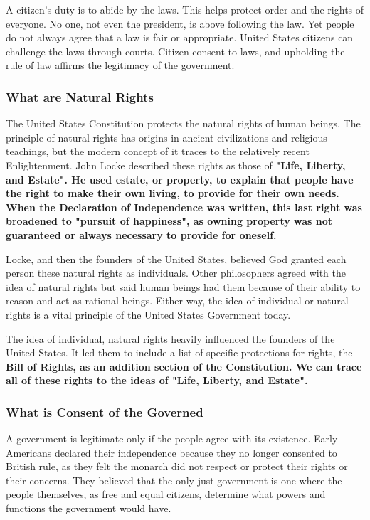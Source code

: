 A citizen's duty is to abide by the laws. This helps protect order and the
rights of everyone. No one, not even the president, is above following the law.
Yet people do not always agree that a law is fair or appropriate. United States
citizens can challenge the laws through courts. Citizen consent to laws, and
upholding the rule of law affirms the legitimacy of the government.

\subsubsection*{What are Natural Rights}

The United States Constitution protects the natural rights of human beings. The
principle of natural rights has origins in ancient civilizations and religious
teachings, but the modern concept of it traces to the relatively recent
Enlightenment. John Locke described these rights as those of \bf{"Life,
Liberty, and Estate"}. He used estate, or property, to explain that people have
the right to make their own living, to provide for their own needs. When the
Declaration of Independence was written, this last right was broadened to
"pursuit of happiness", as owning property was not guaranteed or always
necessary to provide for oneself.

Locke, and then the founders of the United States, believed God granted each
person these natural rights as individuals. Other philosophers agreed with the
idea of natural rights but said human beings had them because of their ability
to reason and act as rational beings. Either way, the idea of individual or
natural rights is a vital principle of the United States Government today.

The idea of individual, natural rights heavily influenced the founders of the
United States. It led them to include a list of specific protections for
rights, the \bf{Bill of Rights}, as an addition section of the
Constitution. We can trace all of these rights to the ideas of \bf{"Life,
Liberty, and Estate"}.

\subsubsection*{What is Consent of the Governed}

A government is legitimate only if the people agree with its existence. Early
Americans declared their independence because they no longer consented to
British rule, as they felt the monarch did not respect or protect their rights
or their concerns. They believed that the only just government is one where the
people themselves, as free and equal citizens, determine what powers and
functions the government would have.

